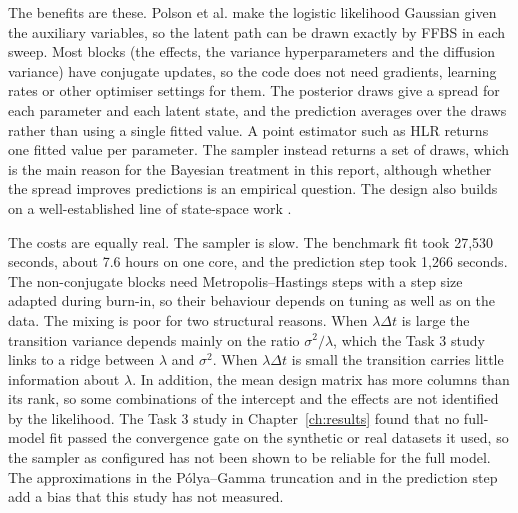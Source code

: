 The benefits are these. Polson et al. \cite{polson2013pg} make the logistic likelihood Gaussian given
the auxiliary variables, so the latent path can be drawn exactly by FFBS in each sweep. Most blocks
(the effects, the variance hyperparameters and the diffusion variance) have conjugate updates, so the
code does not need gradients, learning rates or other optimiser settings for them. The posterior draws
give a spread for each parameter and each latent state, and the prediction averages over the draws
rather than using a single fitted value. A point estimator such as HLR \cite{settles2016trainable} returns one fitted value per parameter. The sampler instead returns a set of draws, which is the main reason for the Bayesian treatment in this report, although whether the spread improves predictions is an empirical question. The design also builds on a well-established line of state-space
work \cite{carter1994gibbs,fruhwirth1994data,west1997bayesian}.

The costs are equally real. The sampler is slow. The benchmark fit took 27,530 seconds, about 7.6
hours on one core, and the prediction step took 1,266 seconds. The non-conjugate blocks need
Metropolis--Hastings steps with a step size adapted during burn-in, so their behaviour depends on
tuning as well as on the data. The mixing is poor for two structural reasons. When $\lambda\Delta t$
is large the transition variance depends mainly on the ratio $\sigma^2/\lambda$, which the Task 3 study links to a ridge between $\lambda$ and $\sigma^2$. When $\lambda\Delta t$ is small the
transition carries little information about $\lambda$. In addition, the mean design matrix has more
columns than its rank, so some combinations of the intercept and the effects are not identified by
the likelihood. The Task 3 study in Chapter~\ref{ch:results} found that no full-model fit passed the
convergence gate on the synthetic or real datasets it used, so the sampler as configured has not been shown to be reliable for the full model. The approximations in the P\'olya--Gamma truncation and in the prediction step
add a bias that this study has not measured.

